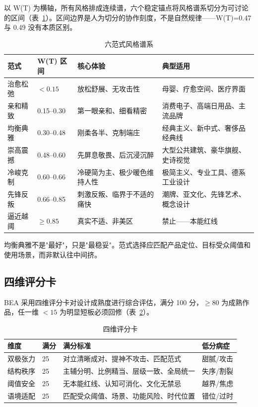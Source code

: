 \documentclass[10pt,a4paper]{article}
\begin{document}
以 W(T) 为横轴，所有风格排成连续谱，六个稳定锚点将风格谱系切分为可讨论的区间（表~\ref{tab:paradigms}）。区间边界是人为切分的协作刻度，不是自然规律——W(T)=0.47 与 0.49 没有本质区别。

\begin{table}[H]
\centering
\caption{六范式风格谱系}
\label{tab:paradigms}
\begin{tabular}{p{2cm}p{1.8cm}p{3.5cm}p{4cm}}
\toprule
\textbf{范式} & \textbf{W(T) 区间} & \textbf{核心体验} & \textbf{典型适用} \\
\midrule
治愈松弛 & $<0.15$ & 放松舒展、无攻击性 & 母婴、疗愈空间、医疗界面 \\
亲和精致 & 0.15--0.30 & 第一眼亲和、细看精密 & 消费电子、高端日用品、主流品牌 \\
均衡典雅 & 0.30--0.48 & 刚柔各半、克制端庄 & 经典主义、新中式、奢侈品经典线 \\
崇高震撼 & 0.48--0.60 & 先屏息敬畏、后沉浸沉醉 & 大型公共建筑、豪华旗舰、史诗视觉 \\
冷峻克制 & 0.60--0.66 & 冷硬简为主、极少暖色维持人性 & 极简主义、专业工具、德系工业设计 \\
先锋反叛 & 0.66--0.85 & 刺激反叛、临界于不适的痛快 & 潮牌、亚文化、先锋艺术、概念设计 \\
逼近越阈 & $\geq 0.85$ & 真实不适、非美区 & 禁止——本能红线 \\
\bottomrule
\end{tabular}
\end{table}

均衡典雅不是"最好"，只是"最稳妥"。范式选择应匹配产品定位、目标受众阈值和使用场景，而非默认往中间挤。

\subsection{四维评分卡}

BEA 采用四维评分卡对设计成熟度进行综合评估，满分 100 分，$\geq 80$ 为成熟作品，任一维 $<15$ 为明显短板必须回修（表~\ref{tab:scorecard}）。

\begin{table}[H]
\centering
\caption{四维评分卡}
\label{tab:scorecard}
\begin{tabular}{p{2.2cm}p{1.2cm}p{4.5cm}p{3.5cm}}
\toprule
\textbf{维度} & \textbf{满分} & \textbf{满分标准} & \textbf{低分病症} \\
\midrule
双极张力 & 25 & 对立清晰成对、提神不攻击、匹配范式 & 甜腻/攻击 \\
结构秩序 & 25 & 主辅分明、比例精当、层级一致、全局统一 & 失序/割裂 \\
阈值安全 & 25 & 无本能红线、认知可消化、文化无禁忌 & 越界/焦虑 \\
语境适配 & 25 & 匹配受众阈值、场景、功能风险、时代位置 & 错位/过时 \\
\bottomrule
\end{tabular}
\end{table}
\end{document}
